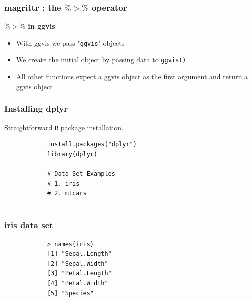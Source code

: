 \documentclass{beamer}
\begin{document}
\begin{frame}
	\frametitle{magrittr :  the $\%>\%$ operator}
	\Large
	\vspace{-1cm}
	\textbf{	$ \%>\% $ in ggvis}
	\begin{itemize}
		\item With ggvis we pass "\texttt{ggvis}" objects
		\item We create the initial object by passing data to
		\texttt{ggvis()}
		\item All other functions expect a ggvis object as the
		first argument and return a ggvis object
	\end{itemize}
	
\end{frame}

	\begin{frame}[fragile]
		\frametitle{Installing dplyr}
		\large
		Straightforward \texttt{R} package installation.
		\begin{framed}
			\begin{verbatim}
			install.packages("dplyr")
			library(dplyr)
			
			# Data Set Examples
			# 1. iris
			# 2. mtcars
			
			\end{verbatim}
		\end{framed}
	\end{frame}
	
	\begin{frame}[fragile]
		\frametitle{iris data set}
		\Large
		\begin{framed}
			\begin{verbatim}
			> names(iris)
			[1] "Sepal.Length"
			[2] "Sepal.Width" 
			[3] "Petal.Length"
			[4] "Petal.Width" 
			[5] "Species"    
			\end{verbatim}
		\end{framed}
	\end{frame}
	
\end{document}
